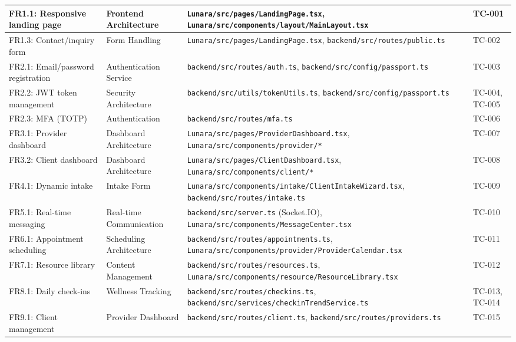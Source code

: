 \documentclass[12pt,letterpaper]{article}
\begin{document}
{\begin{longtable}{|>{\raggedright\arraybackslash}p{2.2cm}|>{\raggedright\arraybackslash}p{2.5cm}|>{\raggedright\arraybackslash}p{5.5cm}|>{\raggedright\arraybackslash}p{2.5cm}|}
FR1.1: Responsive landing page & Frontend Architecture & \texttt{Lunara/src/pages/LandingPage.tsx}, \texttt{Lunara/src/components/layout/MainLayout.tsx} & TC-001 \\
\hline
\rowcolor{TableRowAlt}
FR1.3: Contact/inquiry form & Form Handling & \texttt{Lunara/src/pages/LandingPage.tsx}, \texttt{backend/src/routes/public.ts} & TC-002 \\
\hline
FR2.1: Email/password registration & Authentication Service & \texttt{backend/src/routes/auth.ts}, \texttt{backend/src/config/passport.ts} & TC-003 \\
\hline
\rowcolor{TableRowAlt}
FR2.2: JWT token management & Security Architecture & \texttt{backend/src/utils/tokenUtils.ts}, \texttt{backend/src/config/passport.ts} & TC-004, TC-005 \\
\hline
FR2.3: MFA (TOTP) & Authentication & \texttt{backend/src/routes/mfa.ts} & TC-006 \\
\hline
\rowcolor{TableRowAlt}
FR3.1: Provider dashboard & Dashboard Architecture & \texttt{Lunara/src/pages/ProviderDashboard.tsx}, \texttt{Lunara/src/components/provider/*} & TC-007 \\
\hline
FR3.2: Client dashboard & Dashboard Architecture & \texttt{Lunara/src/pages/ClientDashboard.tsx}, \texttt{Lunara/src/components/client/*} & TC-008 \\
\hline
\rowcolor{TableRowAlt}
FR4.1: Dynamic intake & Intake Form & \texttt{Lunara/src/components/intake/ClientIntakeWizard.tsx}, \texttt{backend/src/routes/intake.ts} & TC-009 \\
\hline
FR5.1: Real-time messaging & Real-time Communication & \texttt{backend/src/server.ts} (Socket.IO), \texttt{Lunara/src/components/MessageCenter.tsx} & TC-010 \\
\hline
\rowcolor{TableRowAlt}
FR6.1: Appointment scheduling & Scheduling Architecture & \texttt{backend/src/routes/appointments.ts}, \texttt{Lunara/src/components/provider/ProviderCalendar.tsx} & TC-011 \\
\hline
FR7.1: Resource library & Content Management & \texttt{backend/src/routes/resources.ts}, \texttt{Lunara/src/components/resource/ResourceLibrary.tsx} & TC-012 \\
\hline
\rowcolor{TableRowAlt}
FR8.1: Daily check-ins & Wellness Tracking & \texttt{backend/src/routes/checkins.ts}, \texttt{backend/src/services/checkinTrendService.ts} & TC-013, TC-014 \\
\hline
FR9.1: Client management & Provider Dashboard & \texttt{backend/src/routes/client.ts}, \texttt{backend/src/routes/providers.ts} & TC-015 \\

\end{longtable}}
\end{document}
